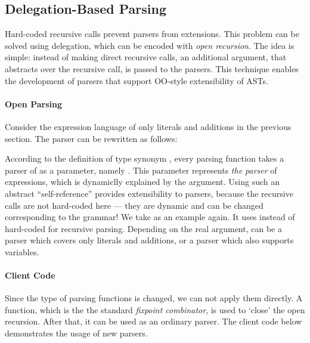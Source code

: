 \subsection{Delegation-Based Parsing}\label{subsec:overview-delegation}

Hard-coded recursive calls prevent parsers from extensions.
This problem can be solved using delegation, which can be encoded with
\textit{open recursion}. The idea is simple: instead of making direct
recursive calls, an additional argument, that abstracts over the
recursive call, is passed to the parsers. This technique enables the
development of parsers that support OO-style extensibility of ASTs.

\paragraph{Open Parsing} Consider the expression language of only literals and additions in the previous section. The parser can be rewritten as follows:


According to the definition of type synonym ,
every parsing function takes a parser of  as a
parameter, namely . This parameter 
represents \emph{the parser} of expressions, which is dynamiclly
explained by the argument. Using such an abstract ``self-reference'' provides
extensibility to parsers, because the recursive calls are not
hard-coded here --- they are dynamic and can be changed corresponding
to the grammar!
We take  as an example again. It uses
 instead of hard-coded  for
recursive parsing. Depending on the real argument, 
can be a parser which covers only literals and additions, or a
parser which also supports variables.

\paragraph{Client Code} Since the type of parsing functions is
changed, we can not apply them directly. A  function, which is the
the standard \textit{fixpoint combinator}, is used to `close' the open
recursion. After that, it can be used as an ordinary parser.
The client code below demonstrates the usage of new parsers.


